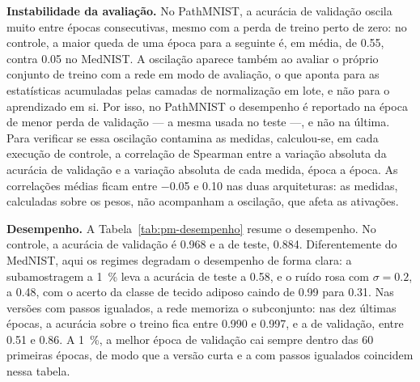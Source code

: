 \textbf{Instabilidade da avaliação.} No PathMNIST, a acurácia de validação
oscila muito entre épocas consecutivas, mesmo com a perda de treino perto de
zero: no controle, a maior queda de uma época para a seguinte é, em média, de
\num{0,55}, contra \num{0,05} no MedNIST. A oscilação aparece também ao avaliar
o próprio conjunto de treino com a rede em modo de avaliação, o que aponta para
as estatísticas acumuladas pelas camadas de normalização em lote, e não para o
aprendizado em si. Por isso, no PathMNIST o desempenho é reportado na época de
menor perda de validação --- a mesma usada no teste ---, e não na última. Para
verificar se essa oscilação contamina as medidas, calculou-se, em cada execução
de controle, a correlação de Spearman entre a variação absoluta da acurácia de
validação e a variação absoluta de cada medida, época a época. As correlações
médias ficam entre \num{-0,05} e \num{0,10} nas duas arquiteturas: as medidas,
calculadas sobre os pesos, não acompanham a oscilação, que afeta as ativações.

\textbf{Desempenho.} A Tabela~\ref{tab:pm-desempenho} resume o desempenho.
No controle, a acurácia de validação é \num{0,968} e a de teste, \num{0,884}.
Diferentemente do MedNIST, aqui os regimes degradam o desempenho de forma
clara: a subamostragem a \SI{1}{\percent} leva a acurácia de teste a
\num{0,58}, e o ruído rosa com $\sigma = \num{0,2}$, a \num{0,48}, com o acerto
da classe de tecido adiposo caindo de \num{0,99} para \num{0,31}. Nas versões
com passos igualados, a rede memoriza o subconjunto: nas dez últimas épocas, a
acurácia sobre o treino fica entre \num{0,990} e \num{0,997}, e a de validação,
entre \num{0,51} e \num{0,86}. A \SI{1}{\percent}, a melhor época de validação
cai sempre dentro das \num{60} primeiras épocas, de modo que a versão curta e a
com passos igualados coincidem nessa tabela.

